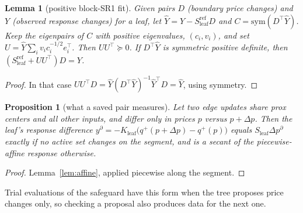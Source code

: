 \documentclass[11pt]{article}
\theoremstyle{plain}
\newtheorem{proposition}[theorem]{Proposition}
\newtheorem{lemma}[theorem]{Lemma}
\theoremstyle{definition}
\theoremstyle{remark}
\begin{document}
\begin{lemma}[positive block-SR1 fit]\label{lem:sr1}
Given pairs $D$ (boundary price changes) and $Y$ (observed response changes) for a leaf, let $\hat Y=Y-S^{\mathrm{ref}}_{\mathrm{leaf}}D$ and $C=\mathrm{sym}(D^\top\hat Y)$. Keep the eigenpairs of $C$ with positive eigenvalues, $(c_i,v_i)$, and set $U=\hat Y\sum_iv_ic_i^{-1/2}e_i^\top$. Then $UU^\top\succeq0$. If $D^\top\hat Y$ is symmetric positive definite, then $(S^{\mathrm{ref}}_{\mathrm{leaf}}+UU^\top)D=Y$.
\end{lemma}
\begin{proof}
In that case $UU^\top D=\hat Y(D^\top\hat Y)^{-1}\hat Y^\top D=\hat Y$, using symmetry.
\end{proof}

\begin{proposition}[what a saved pair measures]\label{prop:pair}
Let two edge updates share prox centers and all other inputs, and differ only in prices $p$ versus $p+\Delta p$. Then the leaf's response difference $y^\partial=-K_{\mathrm{leaf}}\big(q^+(p+\Delta p)-q^+(p)\big)$ equals $S_{\mathrm{leaf}}\Delta p^\partial$ exactly if no active set changes on the segment, and is a secant of the piecewise-affine response otherwise.
\end{proposition}
\begin{proof}
Lemma~\ref{lem:affine}, applied piecewise along the segment.
\end{proof}
Trial evaluations of the safeguard have this form when the tree proposes price changes only, so checking a proposal also produces data for the next one.
\end{document}
